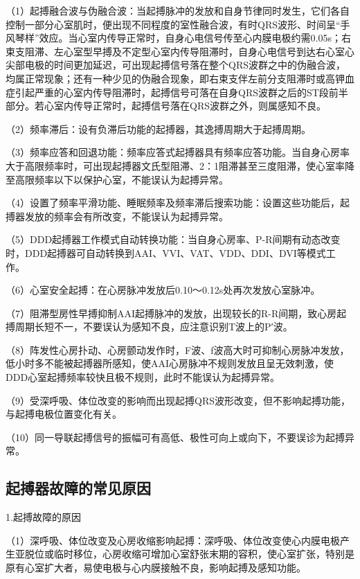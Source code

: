 （1）起搏融合波与伪融合波：当起搏脉冲的发放和自身节律同时发生，它们各自控制一部分心室肌时，便出现不同程度的室性融合波，有时QRS波形、时间呈“手风琴样”效应。当心室内传导正常时，自身心电信号传至心内膜电极约需0.05s；右束支阻滞、左心室型早搏及不定型心室内传导阻滞时，自身心电信号到达右心室心尖部电极的时间更加延迟，可出现起搏信号落在整个QRS波群之中的伪融合波，均属正常现象；还有一种少见的伪融合现象，即右束支伴左前分支阻滞时或高钾血症引起严重的心室内传导阻滞时，起搏信号可落在自身QRS波群之后的ST段前半部分。若心室内传导正常时，起搏信号落在QRS波群之外，则属感知不良。

（2）频率滞后：设有负滞后功能的起搏器，其逸搏周期大于起搏周期。

（3）频率应答和回退功能：频率应答式起搏器具有频率应答功能。当自身心房率大于高限频率时，可出现起搏器文氏型阻滞、2：1阻滞甚至三度阻滞，使心室率降至高限频率以下以保护心室，不能误认为起搏异常。

（4）设置了频率平滑功能、睡眠频率及频率滞后搜索功能：设置这些功能后，起搏器发放的频率会有所改变，不能误认为起搏异常。

（5）DDD起搏器工作模式自动转换功能：当自身心房率、P-R间期有动态改变时，DDD起搏器可自动转换到AAI、VVI、VAT、VDD、DDI、DVI等模式工作。

（6）心室安全起搏：在心房脉冲发放后0.10～0.12s处再次发放心室脉冲。

（7）阻滞型房性早搏抑制AAI起搏脉冲的发放，出现较长的R-R间期，致心房起搏周期长短不一，不要误认为感知不良，应注意识别T波上的P′波。

（8）阵发性心房扑动、心房颤动发作时，F波、f波高大时可抑制心房脉冲发放，低小时多不能被起搏器所感知，使AAI心房脉冲不规则发放且呈无效刺激，使DDD心室起搏频率较快且极不规则，此时不能误认为起搏异常。

（9）受深呼吸、体位改变的影响而出现起搏QRS波形改变，但不影响起搏功能，与起搏电极位置变化有关。

（10）同一导联起搏信号的振幅可有高低、极性可向上或向下，不要误诊为起搏异常。

\protect\hypertarget{text00045.htmlux5cux23subid508}{}{}

\subsection{起搏器故障的常见原因}

1.起搏故障的原因

（1）深呼吸、体位改变及心房收缩影响起搏：深呼吸、体位改变使心内膜电极产生亚脱位或临时移位，心房收缩可增加心室舒张末期的容积，使心室扩张，特别是原有心室扩大者，易使电极与心内膜接触不良，影响起搏及感知功能。

